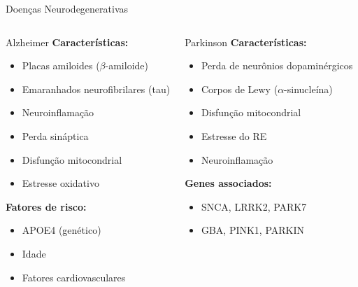 \begin{frame}{Doenças Neurodegenerativas}
\begin{columns}
\begin{block}{Alzheimer}
\textbf{Características:}
\begin{itemize}
    \item Placas amiloides ($\beta$-amiloide)
    \item Emaranhados neurofibrilares (tau)
    \item Neuroinflamação
    \item Perda sináptica
    \item Disfunção mitocondrial
    \item Estresse oxidativo
\end{itemize}

\vspace{0.2cm}

\textbf{Fatores de risco:}
\begin{itemize}
    \item APOE4 (genético)
    \item Idade
    \item Fatores cardiovasculares
\end{itemize}
\end{block}

\begin{block}{Parkinson}
\textbf{Características:}
\begin{itemize}
    \item Perda de neurônios dopaminérgicos
    \item Corpos de Lewy ($\alpha$-sinucleína)
    \item Disfunção mitocondrial
    \item Estresse do RE
    \item Neuroinflamação
\end{itemize}

\vspace{0.2cm}

\textbf{Genes associados:}
\begin{itemize}
    \item SNCA, LRRK2, PARK7
    \item GBA, PINK1, PARKIN
\end{itemize}
\end{block}
\end{columns}

\vspace{0.3cm}

\end{frame}

